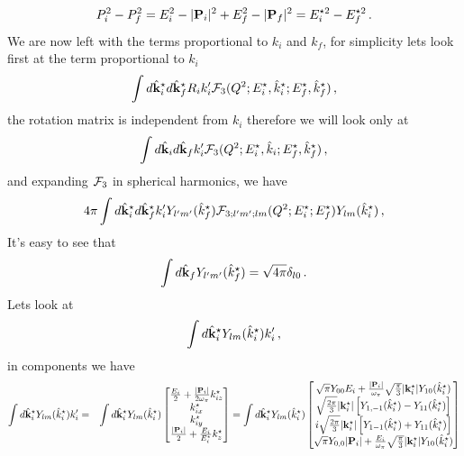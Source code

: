 {\begin{eqnarray}
P_i^2-P_f^2=E_i^2-|{\bf P}_i|^2+E_f^2-|{\bf P}_f|^2=E_i^{\star 2} -E_f^{\star 2}\, .
\end{eqnarray}
 We are now left with the terms proportional to $k_i$ and $k_f$, for simplicity lets look first at the term proportional to $k_i$
\begin{eqnarray}
\int d\hat{{\bf k}}^\star_id\hat{{\bf k}}^\star_fR_ik_i^\prime{\cal F}_3(Q^2;E_i^\star,{\hat k}_i^\star;E_f^\star,\hat{k}^\star_f)\, ,
\end{eqnarray}
the rotation matrix is independent from $k_i$ therefore we will look only at
\begin{eqnarray}
\int d\hat{{\bf k}}_id\hat{{\bf k}}_fk_i^\prime{\cal F}_3(Q^2;E_i^\star,{\hat k}_i;E_f^\star,\hat{k}_f^\star)\, ,
\end{eqnarray}
and expanding ${\cal F}_3$ in spherical harmonics, we have
\begin{eqnarray}
4\pi\int d\hat{{\bf k}}^\star_id\hat{{\bf k}}^\star_fk_i^\prime Y_{l^\prime m^\prime}(\hat{k}^\star_f){\cal F}_{3;l^\prime m^\prime;lm}(Q^2;E_i^\star;E_f^\star)Y_{l m}(\hat{k}^\star_i)\, ,\label{eq:basic_unit}
\end{eqnarray}
It's easy to see that
\begin{eqnarray}
\int d\hat{{\bf k}}_f Y_{l^\prime m^\prime}(\hat{k}_f^\star)=\sqrt{4\pi}\delta_{l0}\, .
\end{eqnarray}
Lets look at 
\begin{eqnarray}
\int d\hat{{\bf k}}^\star_i Y_{l m}(\hat{k}^\star_i)k_i^\prime\, ,
\end{eqnarray}
in components we have
\begin{eqnarray}
\int d\hat{{\bf k}}^\star_i Y_{l m}(\hat{k}^\star_i)k_i^\prime&=&\int d\hat{{\bf k}}^\star_i Y_{l m}(\hat{k}_i^\star)	\begin{bmatrix} \tfrac{E_i}{2} + \tfrac{|\textbf{P}_i|}{2\omega_\pi} k^\star_{iz} \\ k^\star_{ix} \\ k^\star_{iy} \\ \tfrac{|\textbf{P}_i|}{2} + \tfrac{E_i}{E_i^\star} k^\star_z \end{bmatrix}=\int d\hat{{\bf k}}^\star_i Y_{l m}(\hat{k}^\star_i)\begin{bmatrix} \sqrt{\pi}Y_{00}E_i + \tfrac{|\textbf{P}_i|}{\omega_\pi}\sqrt{\frac{\pi}{3}}|{\bf k}_i^\star|Y_{10}(\hat{k}^\star_i) \\ \sqrt{\frac{2\pi}{3}}|{\bf k}_i^\star| \left[Y_{1,-1}(\hat{k}_i^\star)-Y_{11}(\hat{k}_i^\star)\right]\\ i\sqrt{\frac{2\pi}{3}}|{\bf k}_i^\star|\left[Y_{1-1}(\hat{k}_i^\star)+Y_{11}(\hat{k}_i^\star)\right] \\ \sqrt{\pi}Y_{0,0}|{\bf P}_i| + \tfrac{E_i}{\omega_\pi} \sqrt{\frac{\pi}{3}}|{\bf k}^\star_i|Y_{10}(\hat{k}_i^\star) \end{bmatrix}\\

\end{eqnarray}}
